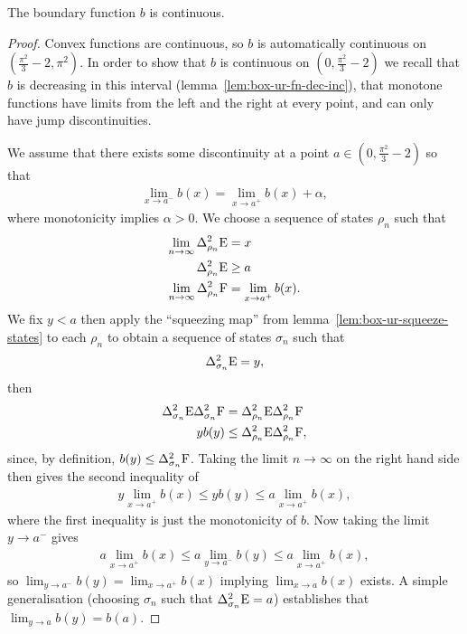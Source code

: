 \begin{lem}
  The boundary function $b$ is continuous.
\end{lem}
\begin{proof}
  Convex functions are continuous, so $b$ is automatically continuous on $\left(\frac{\pi^2}{3}-2, \pi^2\right)$. In order to show that $b$ is continuous on $\left(0, \frac{\pi^2}{3}-2\right)$ we recall that $b$ is decreasing in this interval (lemma~\ref{lem:box-ur-fn-dec-inc}), that monotone functions have limits from the left and the right at every point, and can only have jump discontinuities.

We assume that there exists some discontinuity at a point $a\in\left(0, \frac{\pi^2}{3}-2\right)$ so that
\begin{align}
  \lim_{x\to a^-}b(x) = \lim_{x\to a^+}b(x) + \alpha,
\end{align}
where monotonicity implies $\alpha > 0$. We choose a sequence of states $\rho_n$ such that
\begin{align}
  \lim_{n\to\infty}\var[\rho_n]{\ope} &= x\\
  \var[\rho_n]{\ope} &\geq a\\
  \lim_{n\to\infty}\var[\rho_n]{\opf} &= \lim_{x\to a^+}b(x).
\end{align}
We fix $y < a$ then apply the ``squeezing map'' from lemma~\ref{lem:box-ur-squeeze-states} to each $\rho_n$ to obtain a sequence of states $\sigma_n$ such that
\begin{align}
  \var[\sigma_n]{\ope} = y,
\end{align}
then 
\begin{align}
  \var[\sigma_n]{\ope}\var[\sigma_n]{\opf} &= \var[\rho_n]{\ope}\var[\rho_n]{\opf}\\
  y b(y) &\leq \var[\rho_n]{\ope}\var[\rho_n]{\opf},
\end{align}
since, by definition, $b(y)\leq \var[\sigma_n]{\opf}$. Taking the limit $n\to\infty$ on the right hand side then gives the second inequality of
\begin{align}
  y \lim_{x\to a^+}b(x) \leq y b(y) \leq a \lim_{x\to a^+}b(x),
\end{align}
where the first inequality is just the monotonicity of $b$. Now taking the limit $y\to a^-$ gives
\begin{align}
  a \lim_{x\to a^+}b(x) \leq a \lim_{y\to a^-}b(y) \leq a \lim_{x\to a^+}b(x),
\end{align}
so $\lim_{y\to a^-}b(y) = \lim_{x\to a^+}b(x)$ implying $\lim_{x\to a}b(x)$ exists. A simple generalisation (choosing $\sigma_n$ such that $\var[\sigma_n]{\ope} = a$) establishes that $\lim_{y\to a}b(y) = b(a)$.


\end{proof}
